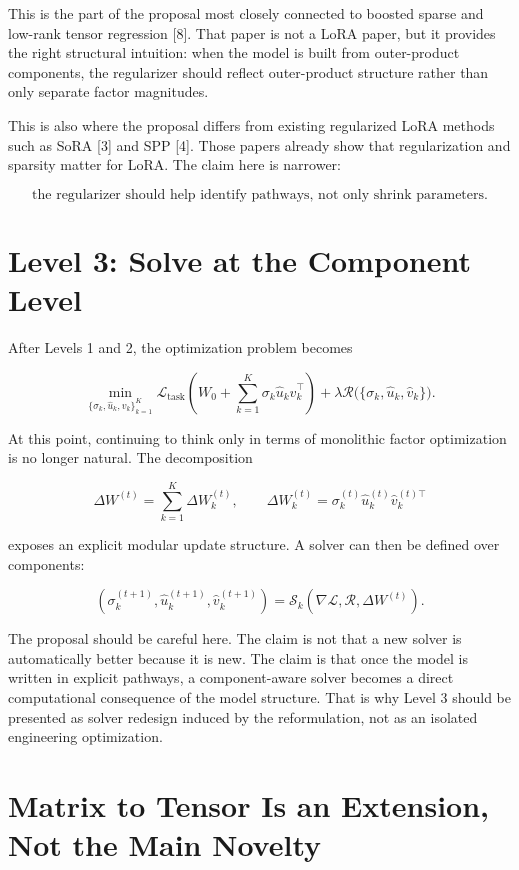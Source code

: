 \documentclass[11pt]{article}
\begin{document}
This is the part of the proposal most closely connected to boosted sparse and low-rank tensor regression [8]. That paper is not a LoRA paper, but it provides the right structural intuition: when the model is built from outer-product components, the regularizer should reflect outer-product structure rather than only separate factor magnitudes.

This is also where the proposal differs from existing regularized LoRA methods such as SoRA [3] and SPP [4]. Those papers already show that regularization and sparsity matter for LoRA. The claim here is narrower:

\[
\text{the regularizer should help identify pathways, not only shrink parameters.}
\]

\section{Level 3: Solve at the Component Level}

After Levels 1 and 2, the optimization problem becomes

\[
\min_{\{\sigma_k,\hat{u}_k,\hat{v}_k\}_{k=1}^{K}}
\mathcal{L}_{\text{task}}
\left(
W_0+\sum_{k=1}^{K}\sigma_k \hat{u}_k \hat{v}_k^\top
\right)
+ \lambda \mathcal{R}\big(\{\sigma_k,\hat{u}_k,\hat{v}_k\}\big).
\]

At this point, continuing to think only in terms of monolithic factor optimization is no longer natural. The decomposition

\[
\Delta W^{(t)} = \sum_{k=1}^{K} \Delta W_k^{(t)}, \qquad
\Delta W_k^{(t)} = \sigma_k^{(t)} \hat{u}_k^{(t)} \hat{v}_k^{(t)\top}
\]

exposes an explicit modular update structure. A solver can then be defined over components:

\[
(\sigma_k^{(t+1)},\hat{u}_k^{(t+1)},\hat{v}_k^{(t+1)})
=
\mathcal{S}_k(\nabla \mathcal{L}, \mathcal{R}, \Delta W^{(t)}).
\]

The proposal should be careful here. The claim is not that a new solver is automatically better because it is new. The claim is that once the model is written in explicit pathways, a component-aware solver becomes a direct computational consequence of the model structure. That is why Level 3 should be presented as solver redesign induced by the reformulation, not as an isolated engineering optimization.

\section{Matrix to Tensor Is an Extension, Not the Main Novelty}
\end{document}
